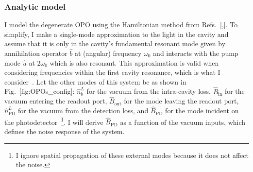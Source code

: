 
\subsubsection{Analytic model}
\label{sec:dOPO_model}


I model the degenerate OPO using the Hamiltonian method from Refs.~\ref{,}.
To simplify, I make a single-mode approximation to the light in the cavity and assume that it is only in the cavity's fundamental resonant mode given by annihilation operator $\hat b$ at (angular) frequency $\omega_0$ and interacts with the pump mode $\hat u$ at $2\omega_0$ which is also resonant. This approximation is valid when considering frequencies within the first cavity resonance, which is what I consider~\cite{}.
Let the other modes of this system be as shown in Fig.~\ref{fig:OPOs_config}: $\hat n^L_b$ for the vacuum from the intra-cavity loss, $\hat B_\text{in}$ for the vacuum entering the readout port, $\hat B_\text{out}$ for the mode leaving the readout port, $\hat n^L_\text{PD}$ for the vacuum from the detection loss, and $\hat B_\text{PD}$ for the mode incident on the photodetector~\footnote{I ignore spatial propagation of these external modes because it does not affect the noise.}. I will derive $\hat B_\text{PD}$ as a function of the vacuum inputs, which defines the noise response of the system. %


